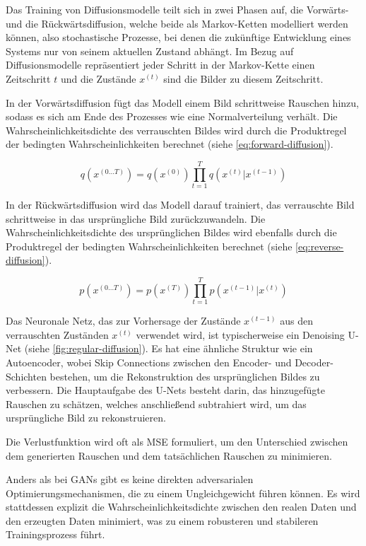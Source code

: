Das Training von Diffusionsmodelle teilt sich in zwei Phasen auf, die Vorwärts- und die Rückwärtsdiffusion, welche beide als Markov-Ketten modelliert werden können, also stochastische Prozesse, bei denen die zukünftige Entwicklung eines Systems nur von seinem aktuellen Zustand abhängt. Im Bezug auf Diffusionsmodelle repräsentiert jeder Schritt in der Markov-Kette einen Zeitschritt $t$ und die Zustände $x^{(t)}$ sind die Bilder zu diesem Zeitschritt.

In der Vorwärtsdiffusion fügt das Modell einem Bild schrittweise Rauschen hinzu, sodass es sich am Ende des Prozesses wie eine Normalverteilung verhält. Die Wahrscheinlichkeitsdichte des verrauschten Bildes wird durch die Produktregel der bedingten Wahrscheinlichkeiten berechnet (siehe \autoref{eq:forward-diffusion}).

\begin{equation}
	q \left( x^{(0 \dots T)} \right) = q \left(x^{(0)}\right)\prod_{t=1}^T q \left(x^{(t)}|x^{(t-1)}\right)
	\label{eq:forward-diffusion}
\end{equation}

In der Rückwärtsdiffusion wird das Modell darauf trainiert, das verrauschte Bild schrittweise in das ursprüngliche Bild zurückzuwandeln. Die Wahrscheinlichkeitsdichte des ursprünglichen Bildes wird ebenfalls durch die Produktregel der bedingten Wahrscheinlichkeiten berechnet (siehe \autoref{eq:reverse-diffusion}).

\begin{equation}
	p \left( x^{(0 \dots T)} \right) = p \left(x^{(T)}\right)\prod_{t=1}^T p \left(x^{(t-1)}|x^{(t)}\right)
	\label{eq:reverse-diffusion}
\end{equation}

Das Neuronale Netz, das zur Vorhersage der Zustände $x^{(t-1)}$ aus den verrauschten Zuständen $x^{(t)}$ verwendet wird, ist typischerweise ein Denoising U-Net (siehe \autoref{fig:regular-diffusion}). Es hat eine ähnliche Struktur wie ein Autoencoder, wobei Skip Connections zwischen den Encoder- und Decoder-Schichten bestehen, um die Rekonstruktion des ursprünglichen Bildes zu verbessern. Die Hauptaufgabe des U-Nets besteht darin, das hinzugefügte Rauschen zu schätzen, welches anschließend subtrahiert wird, um das ursprüngliche Bild zu rekonstruieren.

Die Verlustfunktion wird oft als MSE formuliert, um den Unterschied zwischen dem generierten Rauschen und dem tatsächlichen Rauschen zu minimieren.

Anders als bei GANs gibt es keine direkten adversarialen Optimierungsmechanismen, die zu einem Ungleichgewicht führen können. Es wird stattdessen explizit die Wahrscheinlichkeitsdichte zwischen den realen Daten und den erzeugten Daten minimiert, was zu einem robusteren und stabileren Trainingsprozess führt.

